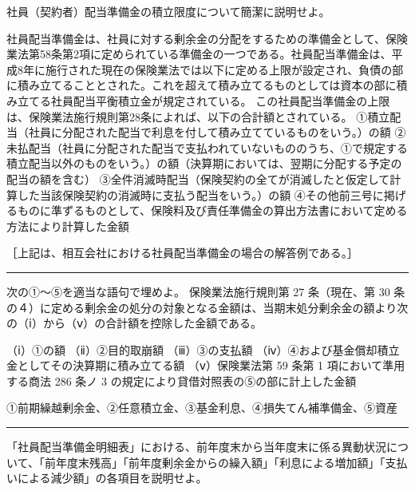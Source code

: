\documentclass[report,gutter=10mm,fore-edge=10mm,uplatex,dvipdfmx]{jlreq}
\begin{document}

社員（契約者）配当準備金の積立限度について簡潔に説明せよ。


社員配当準備金は、社員に対する剰余金の分配をするための準備金として、保険業法第58条第2項に定められている準備金の一つである。社員配当準備金は、平成8年に施行された現在の保険業法では以下に定める上限が設定され、負債の部に積み立てることとされた。これを超えて積み立てるものとしては資本の部に積み立てる社員配当平衡積立金が規定されている。
この社員配当準備金の上限は、保険業法施行規則第28条によれば、以下の合計額とされている。
①積立配当（社員に分配された配当で利息を付して積み立てているものをいう。）の額
②未払配当（社員に分配された配当で支払われていないもののうち、①で規定する積立配当以外のものをいう。）の額（決算期においては、翌期に分配する予定の配当の額を含む）
③全件消滅時配当（保険契約の全てが消滅したと仮定して計算した当該保険契約の消滅時に支払う配当をいう。）の額
④その他前三号に掲げるものに準ずるものとして、保険料及び責任準備金の算出方法書において定める方法により計算した金額

［上記は、相互会社における社員配当準備金の場合の解答例である。］

\begin{center}\rule{0.5\linewidth}{0.5pt}\end{center}


次の①～⑤を適当な語句で埋めよ。 保険業法施行規則第 27 条（現在、第 30
条の４）に定める剰余金の処分の対象となる金額は、当期末処分剰余金の額より次の（ⅰ）から（ⅴ）の合計額を控除した金額である。

（ⅰ）①の額 （ⅱ）②目的取崩額 （ⅲ）③の支払額
（ⅳ）④および基金償却積立金としてその決算期に積み立てる額 （ⅴ）保険業法第
59 条第 1 項において準用する商法 286 条ノ 3
の規定により貸借対照表の⑤の部に計上した金額


①前期繰越剰余金、②任意積立金、③基金利息、④損失てん補準備金、⑤資産

\begin{center}\rule{0.5\linewidth}{0.5pt}\end{center}


「社員配当準備金明細表」における、前年度末から当年度末に係る異動状況について、「前年度末残高」「前年度剰余金からの繰入額」「利息による増加額」「支払いによる減少額」の各項目を説明せよ。
\end{document}
